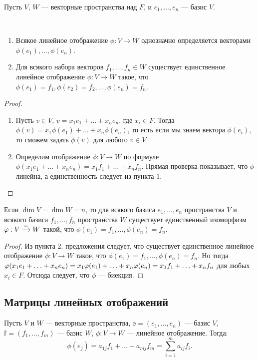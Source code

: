 Пусть $V$, $W$ --- векторные пространства над $F$, и $e_1, \ldots, e_n$ --- базис $V$.
\begin{Suggestion} \ 
\begin{enumerate}
\item Всякое линейное отображение $\phi : V \rightarrow W$ однозначно определяется векторами $\phi(e_1), \ldots, \phi(e_n)$.
\item Для всякого набора векторов $f_1, \ldots, f_n \in W$ существует единственное линейное отображение $\phi: V \rightarrow W$ такое, что $\phi(e_1) = f_1, \phi(e_2) = f_2, \ldots, \phi(e_n) = f_n$.
\end{enumerate}
\end{Suggestion}
\begin{proof} \ 
\begin{enumerate}
\item Пусть $v \in V$, $v = x_1 e_1 + \ldots + x_ne_n$, где $x_i \in F$. Тогда $\phi(v) = x_1\phi(e_1) + \ldots + x_n \phi(e_n)$, то есть если мы знаем  вектора $\phi(e_i)$, то сможем задать $\phi(v)$ для любого $v \in V$.
\item Определим отображение $\phi: V \rightarrow W$ по формуле $\phi(x_1 e_1 + \ldots + x_n e_n) = x_1f_1 + \ldots + x_nf_n$. Прямая проверка показывает, что $\phi$ линейна, а единственность следует из пункта 1.
\end{enumerate}
\end{proof}

\begin{Consequence}
Если $\dim V = \dim W = n$, то для всякого базиса $e_1, \ldots, e_n$ пространства $V$ и всякого базиса $f_1, \ldots , f_n$ пространства $W$ существует единственный изоморфизм $\varphi: V \xrightarrow{\sim} W$ такой, что $\phi(e_1) = f_1, \ldots, \phi(e_n) = f_n$.
\end{Consequence}
\begin{proof}
Из пункта 2. предложения следует, что существует единственное линейное отображение $\phi: V \rightarrow W$ такое, что $\phi(e_1) = f_1, \ldots, \phi(e_n) = f_n$. Но тогда $\phi(x_1e_1 + \ldots + x_ne_n) \hm= x_1\phi(e_1) + \ldots + x_n\phi(e_n) = x_1f_1 + \ldots + x_nf_n$ для любых $x_i \in F$. Отсюда следует, что $\phi$ --- биекция. 
\end{proof}

\subsection{Матрицы линейных отображений}

Пусть $V$ и $W$ --- векторные пространства, $\mathbb{e} = (e_1, \ldots, e_n)$ --- базис $V$, $\mathbb{f} = (f_1, \ldots, f_m)$ --- базис $W$, $\phi: V \rightarrow W$ --- линейное отображение. Тогда:
\[
\phi(e_j) = a_{1j}f_1 + \ldots + a_{mj}f_m = \sum_{i = 1}^{m}a_{ij}f_i.
\]

